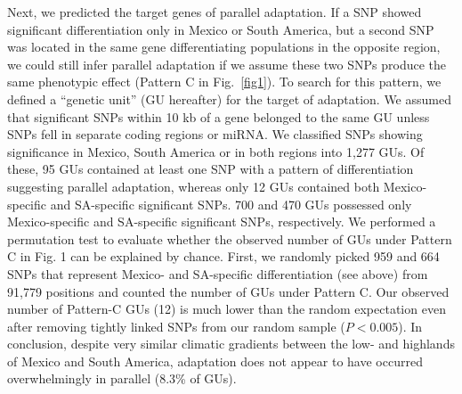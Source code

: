 {{Next, we predicted the target genes of parallel adaptation.  
If a SNP showed significant differentiation only in Mexico or South America, but a second SNP was located in the same gene differentiating populations in the opposite region, we could still infer parallel adaptation if we assume these two SNPs produce the same phenotypic effect (Pattern C in Fig.~\ref{fig1}).
To search for this pattern, we defined a ``genetic unit'' (GU hereafter) for the target of adaptation.
We assumed that significant SNPs within 10 kb of a gene belonged to the same GU unless SNPs fell in separate coding regions or miRNA.    
We classified SNPs showing significance in Mexico, South America or in both regions into 1,277 GUs. 
Of these, 95 GUs contained at least one SNP with a pattern of differentiation suggesting parallel adaptation, whereas only 12 GUs contained both Mexico-specific and SA-specific significant SNPs. 
700 and 470 GUs possessed only Mexico-specific and SA-specific significant SNPs, respectively.  
We performed a permutation test to evaluate whether the observed number of GUs under Pattern C in Fig. 1 can be explained by chance.
First, we randomly picked 959 and 664 SNPs that represent Mexico- and SA-specific differentiation (see above) from 91,779 positions and counted the number of GUs under Pattern C.
Our observed number of Pattern-C GUs (12) is much lower than the random expectation 
even after removing tightly linked SNPs from our random sample ($P<0.005$).
In conclusion, despite very similar climatic gradients between the low- and highlands of Mexico and South America, adaptation does not appear to have occurred overwhelmingly in parallel (8.3\% of GUs). 
\\


}}
